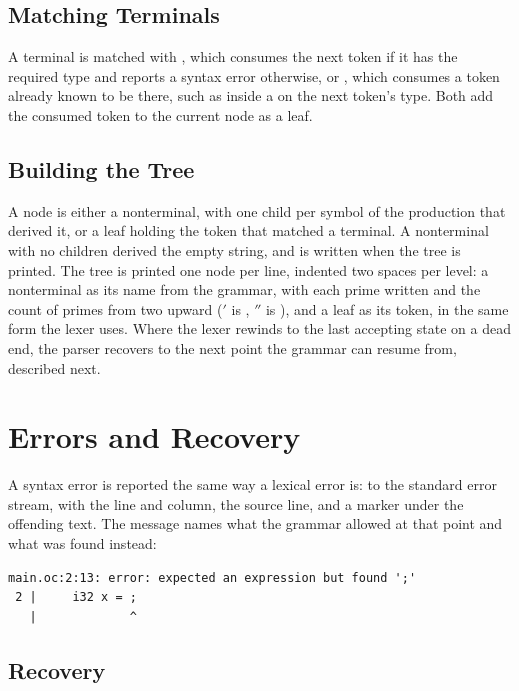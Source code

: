 \subsection{Matching Terminals}

A terminal is matched with , which consumes the next
token if it has the required type and reports a syntax error otherwise,
or , which consumes a token already known to be there,
such as inside a  on the next token's type. Both add the
consumed token to the current node as a leaf.

\subsection{Building the Tree}

A node is either a nonterminal, with one child per symbol of the
production that derived it, or a leaf holding the token that matched a
terminal. A nonterminal with no children derived the empty string, and is
written  when the tree is printed. The tree is printed one
node per line, indented two spaces per level: a nonterminal as its name
from the grammar, with each prime written  and the count of primes
from two upward ($'$ is , $''$ is
), and a leaf as its token, in the same 
form the lexer uses. Where the lexer rewinds to the last accepting state on
a dead end, the parser recovers to the next point the grammar can resume
from, described next.

\section{Errors and Recovery}

A syntax error is reported the same way a lexical error is: to the
standard error stream, with the line and column, the source line, and a
marker under the offending text. The message names what the grammar
allowed at that point and what was found instead:

\begin{lstlisting}[style=pseudocode]
main.oc:2:13: error: expected an expression but found ';'
 2 |     i32 x = ;
   |             ^
\end{lstlisting}

\subsection{Recovery}

